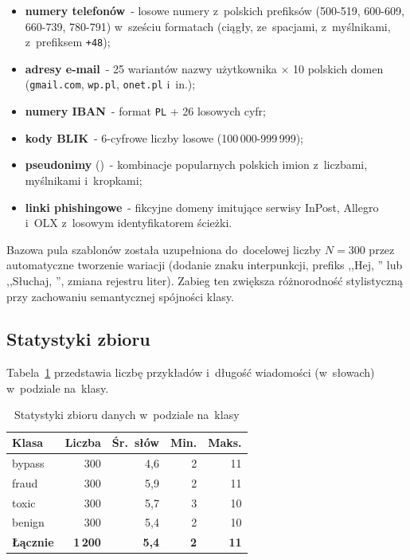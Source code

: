 \begin{itemize}
  \item \textbf{numery telefonów}~- losowe numery z~polskich prefiksów
    (500-519, 600-609, 660-739, 780-791) w~sześciu formatach
    (ciągły, ze~spacjami, z~myślnikami, z~prefiksem \texttt{+48});
  \item \textbf{adresy e-mail}~- 25 wariantów nazwy użytkownika
    $\times$ 10 polskich domen (\texttt{gmail.com}, \texttt{wp.pl},
    \texttt{onet.pl} i~in.);
  \item \textbf{numery IBAN}~- format \texttt{PL} + 26 losowych cyfr;
  \item \textbf{kody BLIK}~- 6-cyfrowe liczby losowe (100\,000-999\,999);
  \item \textbf{pseudonimy} ()~- kombinacje popularnych
    polskich imion z~liczbami, myślnikami i~kropkami;
  \item \textbf{linki phishingowe}~- fikcyjne domeny imitujące serwisy
    InPost, Allegro i~OLX z~losowym identyfikatorem ścieżki.
\end{itemize}

Bazowa pula szablonów została uzupełniona do~docelowej liczby $N = 300$
przez automatyczne tworzenie wariacji (dodanie znaku interpunkcji, prefiks
,,Hej, '' lub ,,Słuchaj, '', zmiana rejestru liter). Zabieg ten zwiększa
różnorodność stylistyczną przy zachowaniu semantycznej spójności klasy.

\subsection{Statystyki zbioru}
\label{sec:dataset-statystyki}

Tabela~\ref{tab:dataset-stats} przedstawia liczbę przykładów i~długość
wiadomości (w~słowach) w~podziale na~klasy.

\begin{table}[H]
\centering
\caption{Statystyki zbioru danych w~podziale na~klasy}
\label{tab:dataset-stats}
\renewcommand{\arraystretch}{1.2}
\begin{tabular}{lrrrr}
\hline
\textbf{Klasa} & \textbf{Liczba} & \textbf{Śr.\ słów} & \textbf{Min.} & \textbf{Maks.} \\
\hline
bypass  & 300 & 4{,}6 & 2 & 11 \\
fraud   & 300 & 5{,}9 & 2 & 11 \\
toxic   & 300 & 5{,}7 & 3 & 10 \\
benign  & 300 & 5{,}4 & 2 & 10 \\
\hline
\textbf{Łącznie} & \textbf{1\,200} & \textbf{5{,}4} & \textbf{2} & \textbf{11} \\
\hline
\end{tabular}
\end{table}

